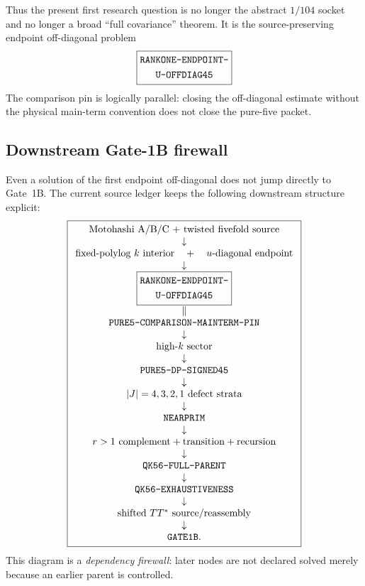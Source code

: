 \documentclass[11pt]{article}
\theoremstyle{definition}
\newcommand{\1}{\mathbf 1}
\begin{document}
{{{Thus the present first research question is no longer the abstract $1/104$ socket and no
longer a broad ``full covariance'' theorem.  It is the source-preserving endpoint
off-diagonal problem
\[
\boxed{\begin{gathered}\text{\ttfamily RANKONE-ENDPOINT-}\\\text{\ttfamily U-OFFDIAG45}\end{gathered}}
\]
The comparison pin is logically parallel: closing the off-diagonal estimate without the
physical main-term convention does not close the pure-five packet.

\subsection{Downstream Gate-1B firewall}

Even a solution of the first endpoint off-diagonal does not jump directly to Gate~1B.
The current source ledger keeps the following downstream structure explicit:
\[
\boxed{
\begin{array}{c}
\text{Motohashi A/B/C + twisted fivefold source}\\
\downarrow\\
\text{fixed-polylog }k\text{ interior}
\quad+\quad
u\text{-diagonal endpoint}\\
\downarrow\\
\boxed{\begin{gathered}\text{\ttfamily RANKONE-ENDPOINT-}\\\text{\ttfamily U-OFFDIAG45}\end{gathered}}\\
\parallel\\
\text{\ttfamily PURE5-COMPARISON-MAINTERM-PIN}\\
\downarrow\\
\text{high-}k\text{ sector}\\
\downarrow\\
\text{\ttfamily PURE5-DP-SIGNED45}\\
\downarrow\\
|J|=4,3,2,1\text{ defect strata}\\
\downarrow\\
\text{\ttfamily NEARPRIM}\\
\downarrow\\
r>1\text{ complement}+\text{transition}+\text{recursion}\\
\downarrow\\
\text{\ttfamily QK56-FULL-PARENT}\\
\downarrow\\
\text{\ttfamily QK56-EXHAUSTIVENESS}\\
\downarrow\\
\text{shifted }TT^\ast\text{ source/reassembly}\\
\downarrow\\
\texttt{GATE1B}.
\end{array}}
\]
This diagram is a \emph{dependency firewall}: later nodes are not declared solved merely
because an earlier parent is controlled.

}}}
\end{document}
